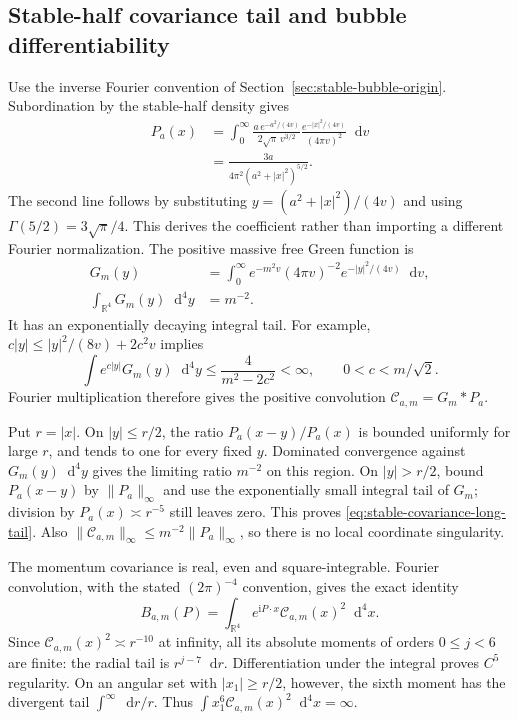 \documentclass[final,5p,times,twocolumn,numbers,nopreprintline]{elsarticle}
\numberwithin{equation}{section}
\theoremstyle{definition}
\theoremstyle{remark}
\newcommand{\dd}{\mathop{}\!\mathrm d}
\newcommand{\ii}{\mathrm i}
\newcommand{\RR}{\mathbb R}
\begin{document}
\subsection{Stable-half covariance tail and bubble differentiability}
\label{sec:stable-bubble-proof}

Use the inverse Fourier convention of
Section~\ref{sec:stable-bubble-origin}. Subordination by the
stable-half density gives
\begin{align}
 P_a(x)
 &=\int_0^\infty
    \frac{a\,e^{-a^2/(4v)}}{2\sqrt\pi\,v^{3/2}}
    \frac{e^{-|x|^2/(4v)}}{(4\pi v)^2}\dd v\nonumber\\
 &=\frac{3a}{4\pi^2(a^2+|x|^2)^{5/2}}.
 \label{eq:four-dimensional-Poisson-kernel}
\end{align}
The second line follows by substituting
\(y=(a^2+|x|^2)/(4v)\) and using
\(\Gamma(5/2)=3\sqrt\pi/4\). This derives the coefficient
rather than importing a different Fourier normalization.
The positive massive free Green function is
\[
\begin{aligned}
 G_m(y)&=\int_0^\infty e^{-m^2v}
       (4\pi v)^{-2}e^{-|y|^2/(4v)}\dd v,\\
 \int_{\RR^4}G_m(y)\dd^4y&=m^{-2}.
\end{aligned}
\]
It has an exponentially decaying integral tail. For example,
\(c|y|\leq |y|^2/(8v)+2c^2v\) implies
\[
 \int e^{c|y|}G_m(y)\dd^4y
       \leq\frac{4}{m^2-2c^2}<\infty,
       \qquad 0<c<m/\sqrt2.
\]
Fourier multiplication therefore gives the positive convolution
\(\mathcal C_{a,m}=G_m*P_a\).

Put \(r=|x|\). On \(|y|\leq r/2\), the ratio
\(P_a(x-y)/P_a(x)\) is bounded uniformly for large \(r\),
and tends to one for every fixed \(y\). Dominated convergence
against \(G_m(y)\dd^4y\) gives the limiting ratio \(m^{-2}\)
on this region. On \(|y|>r/2\), bound \(P_a(x-y)\) by
\(\|P_a\|_\infty\) and use the exponentially small integral
tail of \(G_m\); division by \(P_a(x)\asymp r^{-5}\)
still leaves zero. This proves
\eqref{eq:stable-covariance-long-tail}. Also
\(\|\mathcal C_{a,m}\|_\infty\leq m^{-2}\|P_a\|_\infty\),
so there is no local coordinate singularity.

The momentum covariance is real, even and square-integrable.
Fourier convolution, with the stated \((2\pi)^{-4}\) convention,
gives the exact identity
\begin{equation}
 B_{a,m}(P)=\int_{\RR^4}e^{\ii P\cdot x}
                         \mathcal C_{a,m}(x)^2\dd^4x.
 \label{eq:stable-bubble-coordinate-square}
\end{equation}
Since \(\mathcal C_{a,m}(x)^2\asymp r^{-10}\) at infinity,
all its absolute moments of orders \(0\leq j<6\) are finite:
the radial tail is \(r^{j-7}\dd r\). Differentiation under
the integral proves \(C^5\) regularity. On an angular set with
\(|x_1|\geq r/2\), however, the sixth moment has the divergent
tail \(\int^\infty\dd r/r\). Thus
\(\int x_1^6\mathcal C_{a,m}(x)^2\dd^4x=\infty\).
\end{document}
